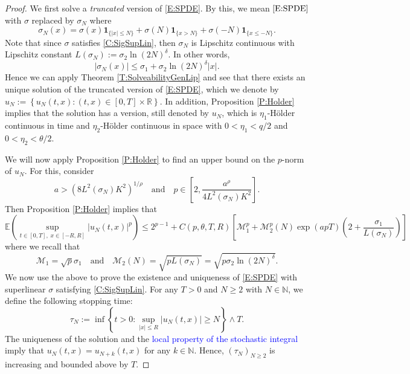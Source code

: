 \documentclass[a4paper,11pt]{article}
\numberwithin{equation}{section}
\theoremstyle{plain}
\theoremstyle{definition}
\newcommand{\R}{\mathbb{R}}
\numberwithin{NQ}{section}
\numberwithin{LQ}{section}
\numberwithin{ZQ}{section}
\begin{document}
	\begin{proof}
		We first solve a {\it truncated} version of \eqref{E:SPDE}. By this, we mean $\eqref{E:SPDE}$ with $\sigma$ replaced by $\sigma_N$ where 
		\[
		\sigma_N(x) = \sigma(x)\textbf{1}_{\{|x| \le N\}} + \sigma(N)\textbf{1}_{\{x  >N\}} + \sigma(-N)\textbf{1}_{\{x \le -N\}}.
		\]
		Note that since $\sigma$ satisfies \eqref{C:SigSupLin}, then $\sigma_N$ is Lipschitz continuous with Lipschitz constant $L(\sigma_N) := \sigma_2 \ln(2N)^{\delta}$. In other words, 
		\[
		|\sigma_N(x)| \le \sigma_1 + \sigma_2 \ln(2N)^{\delta}|x|.
		\]
		Hence we can apply Theorem \ref{T:SolveabilityGenLip} and see that there exists an unique solution of the truncated version of \eqref{E:SPDE}, which we denote by $u_N := \left\{ u_N(t,x) : (t,x) \in [0,T] \times \R \right\}$. In addition, Proposition \ref{P:Holder} implies that the solution has a version, still denoted by $u_N$, which is $\eta_1$-H\"older continuous in time and $\eta_2$-H\"older continuous in space  with $0<\eta_1 < q/2$ and $0<\eta_2 < \theta/2$.
		
		We will now apply Proposition \ref{P:Holder} to find an upper bound on the $p$-norm of $u_N$. For this, consider 
		\[
		a > \left( 8 L^2(\sigma_N) K^2 \right)^{1/\rho} \quad \text{and} \quad p \in \left[ 2, \frac{a^{ \rho}}{4L^2(\sigma_N)K^2} \right].
		\] 
		Then Proposition \ref{P:Holder} implies that 
		\begin{equation}
		\label{E:u_NMomBdd}
		\mathbb{E}\left(\sup_{t\in[0,T],\; x\in[-R,R]} |u_N(t,x)|^p\right) \le 2^{p-1} + C(p, \theta, T,R)\left[\mathcal{M}_1^p + \mathcal{M}_2^p(N) \exp(apT)\left(2+ \frac{\sigma_1}{L(\sigma_N)}\right)\right]
		\end{equation}
		where we recall that 
		\begin{equation}
		\label{D:M1&2forSig_N}
		\mathcal{M}_1 = \sqrt{p}\sigma_1 \quad \text{and} \quad \mathcal{M}_2(N) = \sqrt{pL(\sigma_N)} = \sqrt{p\sigma_2\ln(2N)^\delta}.
		\end{equation}
		We now use the above to prove the existence and uniqueness of \eqref{E:SPDE} with superlinear $\sigma$ satisfying \eqref{C:SigSupLin}. For any $T>0$ and $N \ge 2$ with $N\in \mathbb{N}$, we define the following stopping time:
		\begin{equation}
		\tau_N := \inf \left\{ t>0 : \sup_{|x| \le R} |u_N(t,x)| \ge N \right\} \wedge T.
		\end{equation}
		The uniqueness of the solution and the \textcolor{blue}{local property of the stochastic integral} imply that $u_N(t,x) = u_{N+k}(t,x)$ for any $k \in \mathbb{N}$. Hence, $(\tau_N)_{N \ge 2}$ is increasing and bounded above by $T$. 
		

\end{proof}
\end{document}
